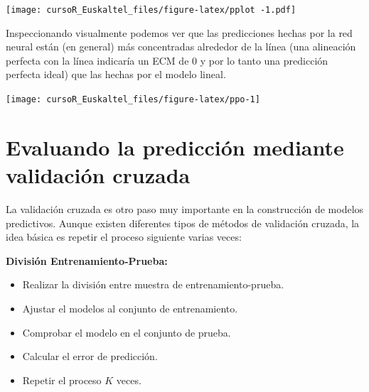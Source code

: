 \documentclass[]{book}
\newenvironment{Shaded}{\begin{snugshade}}{\end{snugshade}}
\newcommand{\KeywordTok}[1]{\textcolor[rgb]{0.13,0.29,0.53}{\textbf{#1}}}
\newcommand{\DataTypeTok}[1]{\textcolor[rgb]{0.13,0.29,0.53}{#1}}
\newcommand{\DecValTok}[1]{\textcolor[rgb]{0.00,0.00,0.81}{#1}}
\newcommand{\FloatTok}[1]{\textcolor[rgb]{0.00,0.00,0.81}{#1}}
\newcommand{\StringTok}[1]{\textcolor[rgb]{0.31,0.60,0.02}{#1}}
\newcommand{\OperatorTok}[1]{\textcolor[rgb]{0.81,0.36,0.00}{\textbf{#1}}}
\newcommand{\NormalTok}[1]{#1}
\providecommand{\tightlist}{%
  \setlength{\itemsep}{0pt}\setlength{\parskip}{0pt}}
\begin{document}
\texttt{[image: cursoR\_Euskaltel\_files/figure-latex/pplot -1.pdf]}

Inspeccionando visualmente podemos ver que las predicciones hechas por
la red neural están (en general) más concentradas alrededor de la línea
(una alineación perfecta con la línea indicaría un ECM de 0 y por lo
tanto una predicción perfecta ideal) que las hechas por el modelo
lineal.

\begin{Shaded}
\end{Shaded}

\begin{center}\texttt{[image: cursoR\_Euskaltel\_files/figure-latex/ppo-1]} \end{center}

\section{Evaluando la predicción mediante validación
cruzada}\label{evaluando-la-prediccion-mediante-validacion-cruzada}

La validación cruzada es otro paso muy importante en la construcción de
modelos predictivos. Aunque existen diferentes tipos de métodos de
validación cruzada, la idea básica es repetir el proceso siguiente
varias veces:

\textbf{División Entrenamiento-Prueba:}

\begin{itemize}
\tightlist
\item
  Realizar la división entre muestra de entrenamiento-prueba.
\item
  Ajustar el modelos al conjunto de entrenamiento.
\item
  Comprobar el modelo en el conjunto de prueba.
\item
  Calcular el error de predicción.
\item
  Repetir el proceso \(K\) veces.
\end{itemize}
\end{document}
